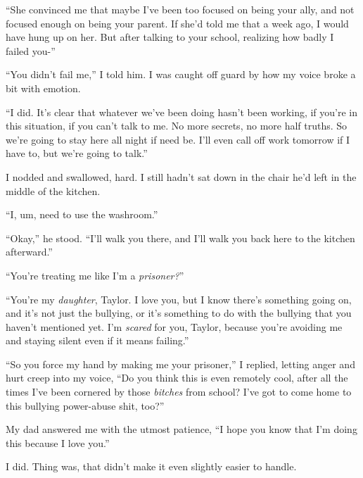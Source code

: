 ``She convinced me that maybe I've been too focused on being your ally, and not focused enough on being your parent.  If she'd told me that a week ago, I would have hung up on her.  But after talking to your school, realizing how badly I failed you-''



``You didn't fail me,'' I told him.  I was caught off guard by how my voice broke a bit with emotion.



``I did.  It's clear that whatever we've been doing hasn't been working, if you're in this situation, if you can't talk to me.  No more secrets, no more half truths.  So we're going to stay here all night if need be.  I'll even call off work tomorrow if I have to, but we're going to talk.''



I nodded and swallowed, hard.  I still hadn't sat down in the chair he'd left in the middle of the kitchen.



``I, um, need to use the washroom.''



``Okay,'' he stood.  ``I'll walk you there, and I'll walk you back here to the kitchen afterward.''



``You're treating me like I'm a\emph{ prisoner?}''



``You're my \emph{daughter}, Taylor.  I love you, but I know there's something going on, and it's not just the bullying, or it's something to do with the bullying that you haven't mentioned yet.  I'm \emph{scared} for you, Taylor, because you're avoiding me and staying silent even if it means failing.''



``So you force my hand by making me your prisoner,'' I replied, letting anger and hurt creep into my voice, ``Do you think this is even remotely cool, after all the times I've been cornered by those \emph{bitches} from school?  I've got to come home to this bullying power-abuse shit, too?''



My dad answered me with the utmost patience, ``I hope you know that I'm doing this because I love you.''



I did.  Thing was, that didn't make it even slightly easier to handle.



